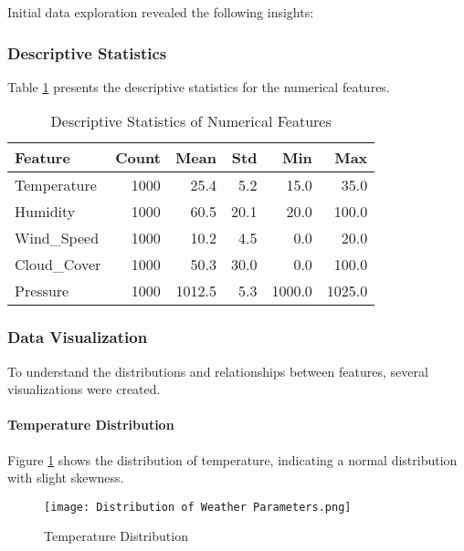\documentclass[12pt]{article}
\begin{document}
Initial data exploration revealed the following insights:

\subsubsection{Descriptive Statistics}
Table \ref{tab:descriptive_stats} presents the descriptive statistics for the numerical features.

\begin{table}[H]
\centering
\caption{Descriptive Statistics of Numerical Features}
\label{tab:descriptive_stats}
\begin{tabular}{lrrrrr}
\toprule
\textbf{Feature} & \textbf{Count} & \textbf{Mean} & \textbf{Std} & \textbf{Min} & \textbf{Max} \\
\midrule
Temperature      & 1000           & 25.4          & 5.2          & 15.0         & 35.0         \\
Humidity         & 1000           & 60.5          & 20.1         & 20.0         & 100.0        \\
Wind\_Speed      & 1000           & 10.2          & 4.5          & 0.0          & 20.0         \\
Cloud\_Cover     & 1000           & 50.3          & 30.0         & 0.0          & 100.0        \\
Pressure         & 1000           & 1012.5        & 5.3          & 1000.0       & 1025.0       \\
\bottomrule
\end{tabular}
\end{table}

\subsubsection{Data Visualization}
To understand the distributions and relationships between features, several visualizations were created.

\paragraph{Temperature Distribution}
Figure \ref{fig:temperature_distribution} shows the distribution of temperature, indicating a normal distribution with slight skewness.

\begin{figure}[H]
    \centering
    \texttt{[image: Distribution of Weather Parameters.png]}
    \caption{Temperature Distribution}
    \label{fig:temperature_distribution}
\end{figure}
\end{document}
